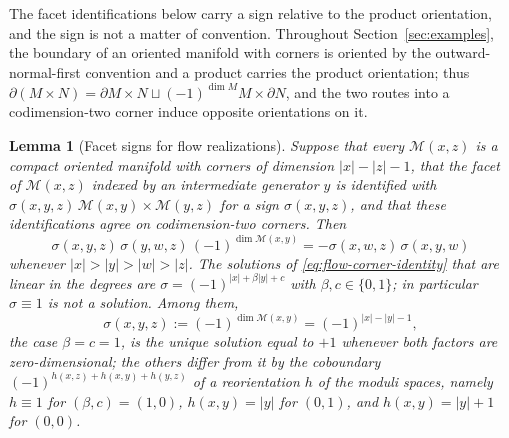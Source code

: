 \documentclass[11pt,letterpaper,twoside]{article}
\theoremstyle{plain}
\newtheorem{lemma}[theorem]{Lemma}
\theoremstyle{definition}
\theoremstyle{remark}
\begin{document}
The facet identifications below carry a sign relative to the product orientation, and the sign is not a matter of convention.  Throughout Section~\ref{sec:examples}, the boundary of an oriented manifold with corners is oriented by the outward-normal-first convention and a product carries the product orientation; thus \(\partial(M\times N)=\partial M\times N\sqcup(-1)^{\dim M}M\times\partial N\), and the two routes into a codimension-two corner induce opposite orientations on it.

\begin{lemma}[Facet signs for flow realizations]\label{lem:flow-sign}
Suppose that every \(\mathcal M(x,z)\) is a compact oriented manifold with corners of dimension \(|x|-|z|-1\), that the facet of \(\mathcal M(x,z)\) indexed by an intermediate generator \(y\) is identified with \(\sigma(x,y,z)\,\mathcal M(x,y)\times\mathcal M(y,z)\) for a sign \(\sigma(x,y,z)\), and that these identifications agree on codimension-two corners.  Then
\begin{equation}\label{eq:flow-corner-identity}
 \sigma(x,y,z)\,\sigma(y,w,z)\,(-1)^{\dim\mathcal M(x,y)}
 =-\sigma(x,w,z)\,\sigma(x,y,w)
\end{equation}
whenever \(|x|>|y|>|w|>|z|\).  The solutions of \eqref{eq:flow-corner-identity} that are linear in the degrees are \(\sigma=(-1)^{|x|+\beta|y|+c}\) with \(\beta,c\in\{0,1\}\); in particular \(\sigma\equiv1\) is not a solution.  Among them,
\begin{equation}\label{eq:flow-facet-sign}
 \sigma(x,y,z):=(-1)^{\dim\mathcal M(x,y)}
 =(-1)^{|x|-|y|-1},
\end{equation}
the case \(\beta=c=1\), is the unique solution equal to \(+1\) whenever both factors are zero-dimensional; the others differ from it by the coboundary \((-1)^{h(x,z)+h(x,y)+h(y,z)}\) of a reorientation \(h\) of the moduli spaces, namely \(h\equiv1\) for \((\beta,c)=(1,0)\), \(h(x,y)=|y|\) for \((0,1)\), and \(h(x,y)=|y|+1\) for \((0,0)\).
\end{lemma}
\end{document}

